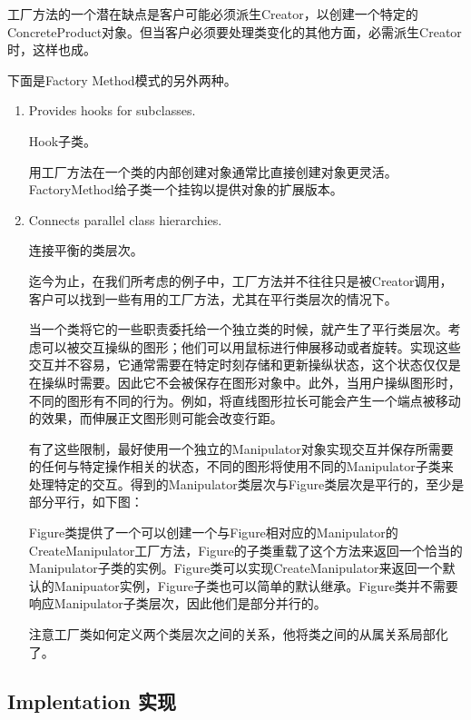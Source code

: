 工厂方法的一个潜在缺点是客户可能必须派生Creator，以创建一个特定的ConcreteProduct对象。但当客户必须要处理类变化的其他方面，必需派生Creator时，这样也成。

下面是Factory Method模式的另外两种。

\begin{enumerate}

\item Provides hooks for subclasses.

      Hook子类。

	  用工厂方法在一个类的内部创建对象通常比直接创建对象更灵活。FactoryMethod给子类一个挂钩以提供对象的扩展版本。

\item Connects parallel class hierarchies.

	  连接平衡的类层次。

	  迄今为止，在我们所考虑的例子中，工厂方法并不往往只是被Creator调用，客户可以找到一些有用的工厂方法，尤其在平行类层次的情况下。

	  当一个类将它的一些职责委托给一个独立类的时候，就产生了平行类层次。考虑可以被交互操纵的图形；他们可以用鼠标进行伸展移动或者旋转。实现这些交互并不容易，它通常需要在特定时刻存储和更新操纵状态，这个状态仅仅是在操纵时需要。因此它不会被保存在图形对象中。此外，当用户操纵图形时，不同的图形有不同的行为。例如，将直线图形拉长可能会产生一个端点被移动的效果，而伸展正文图形则可能会改变行距。

	  有了这些限制，最好使用一个独立的Manipulator对象实现交互并保存所需要的任何与特定操作相关的状态，不同的图形将使用不同的Manipulator子类来处理特定的交互。得到的Manipulator类层次与Figure类层次是平行的，至少是部分平行，如下图：


	  Figure类提供了一个可以创建一个与Figure相对应的Manipulator的CreateManipulator工厂方法，Figure的子类重载了这个方法来返回一个恰当的Manipulator子类的实例。Figure类可以实现CreateManipulator来返回一个默认的Manipuator实例，Figure子类也可以简单的默认继承。Figure类并不需要响应Manipulator子类层次，因此他们是部分并行的。

	  注意工厂类如何定义两个类层次之间的关系，他将类之间的从属关系局部化了。

\end{enumerate}

\subsection{Implentation 实现}

